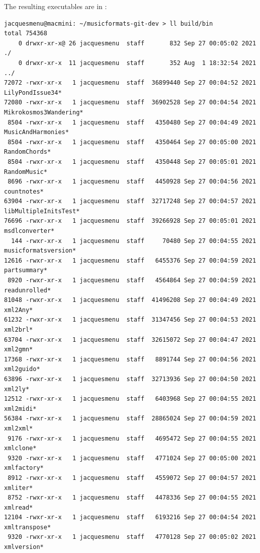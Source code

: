 The resulting executables are in :
\begin{lstlisting}[language=Terminal]
jacquesmenu@macmini: ~/musicformats-git-dev > ll build/bin
total 754368
    0 drwxr-xr-x@ 26 jacquesmenu  staff       832 Sep 27 00:05:02 2021 ./
    0 drwxr-xr-x  11 jacquesmenu  staff       352 Aug  1 18:32:54 2021 ../
72072 -rwxr-xr-x   1 jacquesmenu  staff  36899440 Sep 27 00:04:52 2021 LilyPondIssue34*
72080 -rwxr-xr-x   1 jacquesmenu  staff  36902528 Sep 27 00:04:54 2021 Mikrokosmos3Wandering*
 8504 -rwxr-xr-x   1 jacquesmenu  staff   4350480 Sep 27 00:04:49 2021 MusicAndHarmonies*
 8504 -rwxr-xr-x   1 jacquesmenu  staff   4350464 Sep 27 00:05:00 2021 RandomChords*
 8504 -rwxr-xr-x   1 jacquesmenu  staff   4350448 Sep 27 00:05:01 2021 RandomMusic*
 8696 -rwxr-xr-x   1 jacquesmenu  staff   4450928 Sep 27 00:04:56 2021 countnotes*
63904 -rwxr-xr-x   1 jacquesmenu  staff  32717248 Sep 27 00:04:57 2021 libMultipleInitsTest*
76696 -rwxr-xr-x   1 jacquesmenu  staff  39266928 Sep 27 00:05:01 2021 msdlconverter*
  144 -rwxr-xr-x   1 jacquesmenu  staff     70480 Sep 27 00:04:55 2021 musicformatsversion*
12616 -rwxr-xr-x   1 jacquesmenu  staff   6455376 Sep 27 00:04:59 2021 partsummary*
 8920 -rwxr-xr-x   1 jacquesmenu  staff   4564864 Sep 27 00:04:59 2021 readunrolled*
81048 -rwxr-xr-x   1 jacquesmenu  staff  41496208 Sep 27 00:04:49 2021 xml2Any*
61232 -rwxr-xr-x   1 jacquesmenu  staff  31347456 Sep 27 00:04:53 2021 xml2brl*
63704 -rwxr-xr-x   1 jacquesmenu  staff  32615072 Sep 27 00:04:47 2021 xml2gmn*
17368 -rwxr-xr-x   1 jacquesmenu  staff   8891744 Sep 27 00:04:56 2021 xml2guido*
63896 -rwxr-xr-x   1 jacquesmenu  staff  32713936 Sep 27 00:04:50 2021 xml2ly*
12512 -rwxr-xr-x   1 jacquesmenu  staff   6403968 Sep 27 00:04:55 2021 xml2midi*
56384 -rwxr-xr-x   1 jacquesmenu  staff  28865024 Sep 27 00:04:59 2021 xml2xml*
 9176 -rwxr-xr-x   1 jacquesmenu  staff   4695472 Sep 27 00:04:55 2021 xmlclone*
 9320 -rwxr-xr-x   1 jacquesmenu  staff   4771024 Sep 27 00:05:00 2021 xmlfactory*
 8912 -rwxr-xr-x   1 jacquesmenu  staff   4559072 Sep 27 00:04:57 2021 xmliter*
 8752 -rwxr-xr-x   1 jacquesmenu  staff   4478336 Sep 27 00:04:55 2021 xmlread*
12104 -rwxr-xr-x   1 jacquesmenu  staff   6193216 Sep 27 00:04:54 2021 xmltranspose*
 9320 -rwxr-xr-x   1 jacquesmenu  staff   4770128 Sep 27 00:05:02 2021 xmlversion*
\end{lstlisting}

